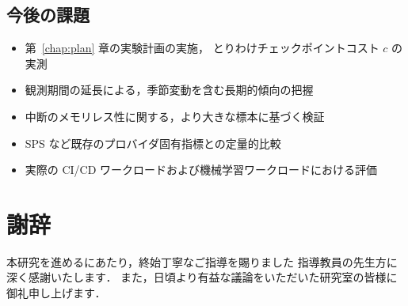 \documentclass[11pt,a4paper]{ltjsreport}
\begin{document}
\section{今後の課題}

\begin{itemize}
  \item 第~\ref{chap:plan} 章の実験計画の実施，
        とりわけチェックポイントコスト $c$ の実測
  \item 観測期間の延長による，季節変動を含む長期的傾向の把握
  \item 中断のメモリレス性に関する，より大きな標本に基づく検証
  \item SPS など既存のプロバイダ固有指標との定量的比較
  \item 実際の CI/CD ワークロードおよび機械学習ワークロードにおける評価
\end{itemize}

\chapter*{謝辞}

本研究を進めるにあたり，終始丁寧なご指導を賜りました
指導教員の先生方に深く感謝いたします．
また，日頃より有益な議論をいただいた研究室の皆様に御礼申し上げます．
\end{document}
